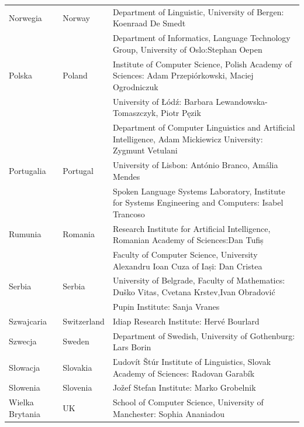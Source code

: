 \begin{longtable}{llp{115mm}}
\addlinespace Norwegia & \textcolor{grey1}{Norway} & Department of
Linguistic, University of Bergen: Koenraad De Smedt\\
\addlinespace & & Department of Informatics, Language Technology
Group, University of Oslo:\newline Stephan Oepen\\
\addlinespace Polska & \textcolor{grey1}{Poland} & Institute of
Computer Science, Polish Academy of Sciences: \newline Adam
Przepiórkowski, Maciej Ogrodniczuk\\
\addlinespace & & University of Łódź: Barbara
Lewandowska-Tomaszczyk, Piotr Pęzik\\
\addlinespace & & Department of Computer Linguistics and Artificial
Intelligence, Adam Mickiewicz University: Zygmunt Vetulani\\
\addlinespace Portugalia & \textcolor{grey1}{Portugal} & University of
Lisbon: António Branco, Amália Mendes\\
\addlinespace & & Spoken Language Systems Laboratory, Institute for
Systems Engineering and Computers: Isabel Trancoso\\
\addlinespace Rumunia & \textcolor{grey1}{Romania} & Research
Institute for Artificial Intelligence, Romanian Academy of
Sciences:\newline Dan Tufiș\\
\addlinespace & & Faculty of Computer Science, University Alexandru
Ioan Cuza of Iași: Dan Cristea\\
\addlinespace Serbia & \textcolor{grey1}{Serbia} & University of
Belgrade, Faculty of Mathematics: Duško Vitas, Cvetana
Krstev,\newline Ivan Obradović\\
\addlinespace & & Pupin Institute: Sanja Vranes\\
\addlinespace Szwajcaria & \textcolor{grey1}{Switzerland} & Idiap
Research Institute: Hervé Bourlard\\
\addlinespace Szwecja & \textcolor{grey1}{Sweden} & Department of
Swedish, University of Gothenburg: Lars Borin\\
\addlinespace Słowacja & \textcolor{grey1}{Slovakia} & Ľudovít
Štúr Institute of Linguistics, Slovak Academy of Sciences: Radovan
Garabík\\
\addlinespace Słowenia & \textcolor{grey1}{Slovenia} & Jožef Stefan
Institute: Marko Grobelnik\\
\addlinespace Wielka Brytania & \textcolor{grey1}{UK} & School of
Computer Science, University of Manchester: Sophia Ananiadou\\

\end{longtable}
